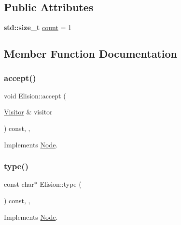\subsection*{Public Attributes}
\begin{DoxyCompactItemize}
\item 
\textbf{ std\+::size\+\_\+t} \hyperlink{struct_elision_a95bc7263a799380ca4e4ddc0cc0eb622}{count} = 1
\end{DoxyCompactItemize}


\subsection{Member Function Documentation}
\mbox{\label{struct_elision_ac99f60fccfcedcf9cd090f5682b2e6dd}} 
\subsubsection{\texorpdfstring{accept()}{accept()}}
{\footnotesize\ttfamily void Elision\+::accept (\begin{DoxyParamCaption}\item[{\hyperlink{struct_visitor}{Visitor} \&}]{visitor }\end{DoxyParamCaption}) const\hspace{0.3cm}{\ttfamily [inline]}, {\ttfamily [override]}, {\ttfamily [virtual]}}



Implements \hyperlink{struct_node_a10bd7af968140bbf5fa461298a969c71}{Node}.

\mbox{\label{struct_elision_adf289443c761e9ffaec9440510dd21c4}} 
\subsubsection{\texorpdfstring{type()}{type()}}
{\footnotesize\ttfamily const char$\ast$ Elision\+::type (\begin{DoxyParamCaption}{ }\end{DoxyParamCaption}) const\hspace{0.3cm}{\ttfamily [inline]}, {\ttfamily [override]}, {\ttfamily [virtual]}}



Implements \hyperlink{struct_node_a82f29420d0a38efcc370352528e94e9b}{Node}.



